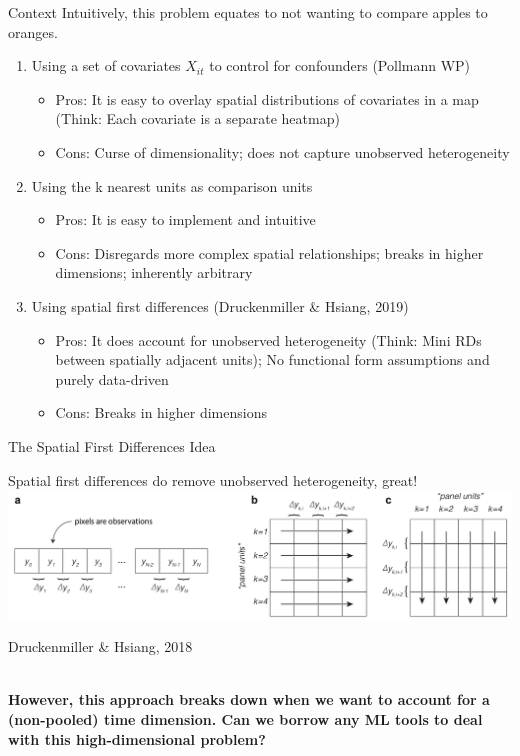 \begin{frame}{Context}
Intuitively, this problem equates to not wanting to compare apples to oranges. \\
\vspace{5pt}
\begin{enumerate}
    \item Using a set of covariates $X_{it}$ to control for confounders (Pollmann WP)
        \begin{itemize}
            \item Pros: It is easy to overlay spatial distributions of covariates in a map (Think: Each covariate is a separate heatmap)
            \item Cons: Curse of dimensionality; does not capture unobserved heterogeneity
        \end{itemize}
    \item Using the k nearest units as comparison units
        \begin{itemize}
            \item Pros: It is easy to implement and intuitive
            \item Cons: Disregards more complex spatial relationships; breaks in higher dimensions; inherently arbitrary
        \end{itemize}
    \item Using spatial first differences (Druckenmiller \& Hsiang, 2019)
        \begin{itemize}
            \item Pros: It does account for unobserved heterogeneity (Think: Mini RDs between spatially adjacent units); No functional form assumptions and purely data-driven
            \item Cons: Breaks in higher dimensions
        \end{itemize}
\end{enumerate}
\end{frame}

\begin{frame}{The Spatial First Differences Idea}

Spatial first differences do remove unobserved heterogeneity, great!\\
\vspace{5pt}
\centering
\includegraphics[scale=0.67]{figures/spatialfd.png}
\caption{\footnotesize{Druckenmiller \& Hsiang, 2018}}\\
\vspace{7pt}
\Rightarrow \textbf{ However, this approach breaks down when we want to account for a (non-pooled) time dimension. Can we borrow any ML tools to deal with this high-dimensional problem?}
\end{frame}

